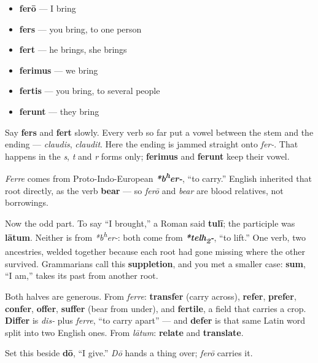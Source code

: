 \begin{itemize}
\raggedright
  \item \textbf{ferō} — I bring
  \item \textbf{fers} — you bring, to one person
  \item \textbf{fert} — he brings, she brings
  \item \textbf{ferimus} — we bring
  \item \textbf{fertis} — you bring, to several people
  \item \textbf{ferunt} — they bring
\end{itemize}

Say \textbf{fers} and \textbf{fert} slowly. Every verb so far put a vowel between the stem and the ending — \emph{claudis}, \emph{claudit}. Here the ending is jammed straight onto \emph{fer-}. That happens in the \emph{s}, \emph{t} and \emph{r} forms only; \textbf{ferimus} and \textbf{ferunt} keep their vowel.

\begin{cousinweb}
\emph{Ferre} comes from Proto-Indo-European \emph{\textbf{*b\textsuperscript{h}er-}}, \textquotedblleft{}to carry.\textquotedblright{} English inherited that root directly, as the verb \textbf{bear} — so \emph{ferō} and \emph{bear} are blood relatives, not borrowings.

Now the odd part. To say \textquotedblleft{}I brought,\textquotedblright{} a Roman said \textbf{tulī}; the participle was \textbf{lātum}. Neither is from \emph{*b\textsuperscript{h}er-}: both come from \emph{\textbf{*telh\textsubscript{2}-}}, \textquotedblleft{}to lift.\textquotedblright{} One verb, two ancestries, welded together because each root had gone missing where the other survived. Grammarians call this \textbf{suppletion}, and you met a smaller case: \textbf{sum}, \textquotedblleft{}I am,\textquotedblright{} takes its past from another root.

Both halves are generous. From \emph{ferre}: \textbf{transfer} (carry across), \textbf{refer}, \textbf{prefer}, \textbf{confer}, \textbf{offer}, \textbf{suffer} (bear from under), and \textbf{fertile}, a field that carries a crop. \textbf{Differ} is \emph{dis-} plus \emph{ferre}, \textquotedblleft{}to carry apart\textquotedblright{} — and \textbf{defer} is that same Latin word split into two English ones. From \emph{lātum}: \textbf{relate} and \textbf{translate}.

Set this beside \textbf{dō}, \textquotedblleft{}I give.\textquotedblright{} \emph{Dō} hands a thing over; \emph{ferō} carries it.
\end{cousinweb}

